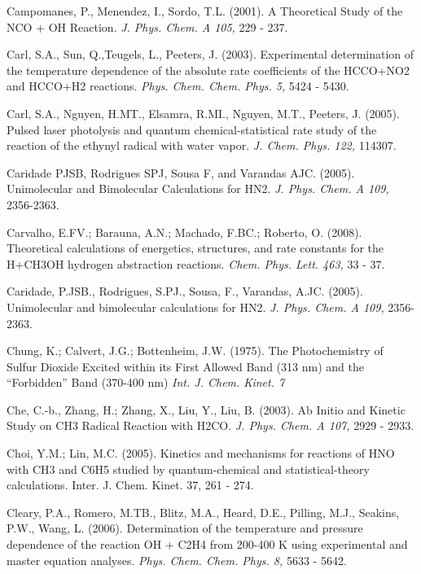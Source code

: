 \documentclass[12pt,landscape]{article}
\newcounter{reaction}
\newcounter{photo}
\begin{document}
Campomanes, P., Menendez, I., Sordo, T.L. (2001). A Theoretical Study of the NCO + OH Reaction. {\em J. Phys. Chem. A 105,}  229 - 237.

Carl, S.A., Sun, Q.,Teugels, L., Peeters, J.  (2003).  Experimental determination of the temperature dependence of the absolute rate coefficients of the HCCO+NO2 and HCCO+H2 reactions.  {\em Phys. Chem. Chem. Phys. 5,}  5424 - 5430.

Carl, S.A., Nguyen, H.MT., Elsamra, R.MI., Nguyen, M.T., Peeters, J. (2005). Pulsed laser photolysis and quantum chemical-statistical rate study of the reaction of the ethynyl radical with water vapor.  {\em J. Chem. Phys. 122,} 114307.

Caridade PJSB, Rodrigues SPJ, Sousa F, and Varandas AJC. (2005). Unimolecular and Bimolecular Calculations for HN2. {\em J. Phys. Chem. A  109,} 2356-2363.

Carvalho, E.FV.; Barauna, A.N.; Machado, F.BC.; Roberto, O. (2008).  Theoretical calculations of energetics, structures, and rate constants for the H+CH3OH hydrogen abstraction reactions. {\em Chem. Phys. Lett.  463,}  33 - 37.

Caridade, P.JSB., Rodrigues, S.PJ., Sousa, F., Varandas, A.JC. (2005). Unimolecular and bimolecular calculations for HN2.   {\em J. Phys. Chem. A  109,} 2356-2363. 

Chung, K.; Calvert, J.G.; Bottenheim, J.W. (1975).
The Photochemistry of Sulfur Dioxide Excited within its First Allowed Band (313 nm) and the ``Forbidden'' Band (370-400 nm)
{\em  Int. J. Chem. Kinet. 7}

Che, C.-b., Zhang, H.; Zhang, X., Liu, Y., Liu, B. (2003). Ab Initio and Kinetic Study on CH3 Radical Reaction with H2CO.  {\em J. Phys. Chem. A 107,} 2929 - 2933.

Choi, Y.M.; Lin, M.C.  (2005). Kinetics and mechanisms for reactions of HNO with CH3 and C6H5 studied by quantum-chemical and statistical-theory calculations.   Inter. J. Chem. Kinet.   37,  261 - 274. 

Cleary, P.A., Romero, M.TB., Blitz, M.A., Heard, D.E., Pilling, M.J., Seakins, P.W., Wang, L. (2006). Determination of the temperature and pressure dependence of the reaction OH + C2H4 from 200-400 K using experimental and master equation analyses. {\em Phys. Chem. Chem. Phys. 8,} 5633 - 5642.
\end{document}
